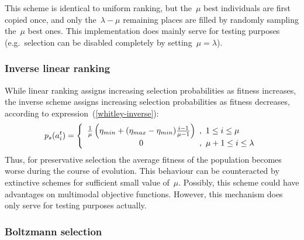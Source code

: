 This scheme is identical to uniform ranking, but the~$\mu$
best individuals are first copied once, and only the~$\lambda-\mu$ 
remaining places are filled by randomly sampling the~$\mu$ best ones.
This implementation does mainly serve for testing purposes (e.g.~selection
can be disabled completely by setting~$\mu = \lambda$).

\subsubsection{Inverse linear ranking}

While linear ranking assigns increasing selection probabilities
as fitness increases, the inverse scheme assigns increasing selection
probabilities as fitness decreases, according to 
expression~(\ref{whitley-inverse}):
%
\begin{equation}\label{whitley-inverse}
	p_s(a^t_i) = \left\{
	\begin{array}{c@{\hspace{0.5em},\hspace{0.5em}}l}
		\frac{1}{\mu}
		\left(\eta_{min} + (\eta_{max} - \eta_{min})
			\frac{i - 1}{\mu - 1}
		\right)	
				& 1 \leq i \leq \mu		\\
		0		& \mu+1 \leq i \leq \lambda	\\
	\end{array} \right.%
\end{equation}
%
Thus, for preservative selection the average fitness of the population
becomes worse during the course of evolution.
This behaviour can be counteracted by extinctive schemes for sufficient
small value of~$\mu$.
Possibly, this scheme could have advantages on multimodal objective 
functions.
However, this mechanism does only serve for testing purposes actually.

\subsubsection{Boltzmann selection}

